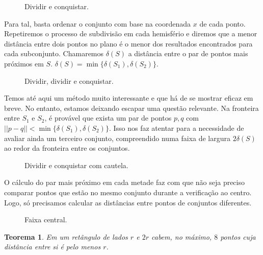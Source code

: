 \documentclass{homework}
\newtheorem*{theorem}{Teorema}
\begin{document}
	\begin{figure}[H]
		\centering
		
		\caption{Dividir e conquistar.}
		\label{fig:3.1}
	\end{figure}
	
	Para tal, basta ordenar o conjunto com base na coordenada $x$ de cada ponto. Repetiremos o processo de subdivisão em cada hemisfério e diremos que a menor distância entre dois pontos no plano é o menor dos resultados encontrados para cada subconjunto. Chamaremos $\delta(S)$ a distância entre o par de pontos mais próximos em $S$. $\delta(S) = \min\{\delta(S_1), \delta(S_2)\}$. \par
	
	\begin{figure}[H]
		\centering
		
		\caption{Dividir, dividir e conquistar.}
		\label{fig:3.2}
	\end{figure}
	
	Temos até aqui um método muito interessante e que há de se mostrar eficaz em breve. No entanto, estamos deixando escapar uma questão relevante. Na fronteira entre $S_1$ e $S_2$, é provável que exista um par de pontos $p, q$ com $||p - q|| < \min\{\delta(S_1), \delta(S_2)\}$. Isso nos faz atentar para a necessidade de avaliar ainda um terceiro conjunto, compreendido numa faixa de largura $2 \delta(S)$ ao redor da fronteira entre os conjuntos.\par
	
	\begin{figure}[H]
		\centering
		
		\caption{Dividir e conquistar com cautela.}
		\label{fig:3.3}
	\end{figure}
	
	O cálculo do par mais próximo em cada metade faz com que não seja preciso comparar pontos que estão no mesmo conjunto durante a verificação ao centro. Logo, só precisamos calcular as distâncias entre pontos de conjuntos diferentes.
	
	\begin{figure}[H]
		\centering
		
		\caption{Faixa central.}
		\label{fig:3.4}
	\end{figure}
	
	\begin{theorem}
		Em um retângulo de lados $r$ e $2r$ cabem, no máximo, $8$ pontos cuja distância entre si é pelo menos $r$.
	\end{theorem}
\end{document}
